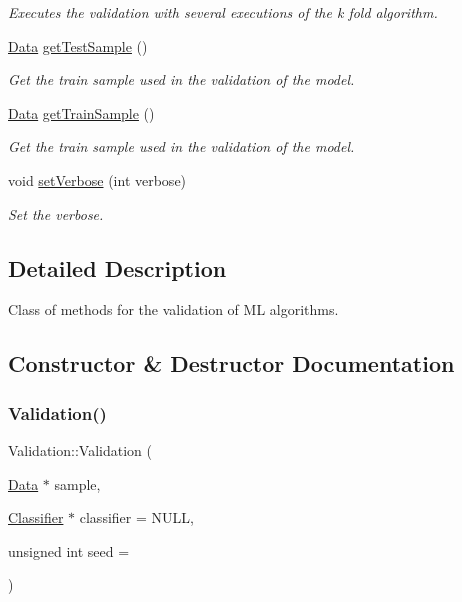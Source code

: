 \begin{DoxyCompactItemize}
\begin{DoxyCompactList}\small\item\em Executes the validation with several executions of the k fold algorithm. \end{DoxyCompactList}\item 
\hyperlink{class_data}{Data} \hyperlink{class_validation_a6ef1b8600535a064b9a94507afdf849c}{get\+Test\+Sample} ()
\begin{DoxyCompactList}\small\item\em Get the train sample used in the validation of the model. \end{DoxyCompactList}\item 
\hyperlink{class_data}{Data} \hyperlink{class_validation_a656f4919ec48a7f26063d046d583433a}{get\+Train\+Sample} ()
\begin{DoxyCompactList}\small\item\em Get the train sample used in the validation of the model. \end{DoxyCompactList}\item 
void \hyperlink{class_validation_ac402fbabbd6148d7c2ac0c7c9a854177}{set\+Verbose} (int verbose)
\begin{DoxyCompactList}\small\item\em Set the verbose. \end{DoxyCompactList}\end{DoxyCompactItemize}


\subsection{Detailed Description}
Class of methods for the validation of ML algorithms. 

\subsection{Constructor \& Destructor Documentation}
\mbox{\label{class_validation_a83ac736d2ed4d21140a05ff6ccbdec40}} 
\subsubsection{\texorpdfstring{Validation()}{Validation()}}
{\footnotesize\ttfamily Validation\+::\+Validation (\begin{DoxyParamCaption}\item[{\hyperlink{class_data}{Data} $\ast$}]{sample,  }\item[{\hyperlink{class_classifier}{Classifier} $\ast$}]{classifier = {\ttfamily NULL},  }\item[{unsigned int}]{seed = {} }\end{DoxyParamCaption})\hspace{0.3cm}{\ttfamily [explicit]}}



